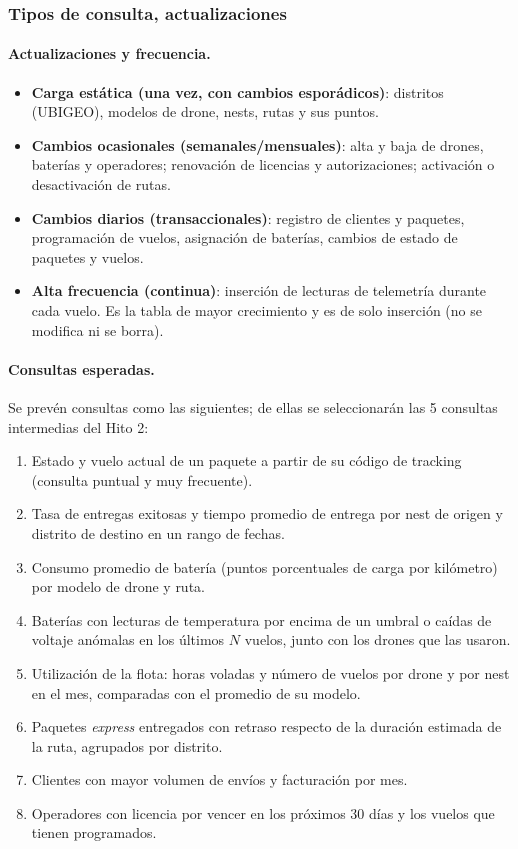 \documentclass[11pt,a4paper]{article}
\begin{document}
\subsubsection{Tipos de consulta, actualizaciones}
\paragraph{Actualizaciones y frecuencia.}
\begin{itemize}
\item \textbf{Carga estática (una vez, con cambios esporádicos)}: distritos (UBIGEO), modelos de drone, nests, rutas y sus puntos.
\item \textbf{Cambios ocasionales (semanales/mensuales)}: alta y baja de drones, baterías y operadores; renovación de licencias y autorizaciones; activación o desactivación de rutas.
\item \textbf{Cambios diarios (transaccionales)}: registro de clientes y paquetes, programación de vuelos, asignación de baterías, cambios de estado de paquetes y vuelos.
\item \textbf{Alta frecuencia (continua)}: inserción de lecturas de telemetría durante cada vuelo. Es la tabla de mayor crecimiento y es de solo inserción (no se modifica ni se borra).
\end{itemize}

\paragraph{Consultas esperadas.} Se prevén consultas como las siguientes; de ellas se seleccionarán las 5 consultas intermedias del Hito 2:
\begin{enumerate}
\item Estado y vuelo actual de un paquete a partir de su código de tracking (consulta puntual y muy frecuente).
\item Tasa de entregas exitosas y tiempo promedio de entrega por nest de origen y distrito de destino en un rango de fechas.
\item Consumo promedio de batería (puntos porcentuales de carga por kilómetro) por modelo de drone y ruta.
\item Baterías con lecturas de temperatura por encima de un umbral o caídas de voltaje anómalas en los últimos $N$ vuelos, junto con los drones que las usaron.
\item Utilización de la flota: horas voladas y número de vuelos por drone y por nest en el mes, comparadas con el promedio de su modelo.
\item Paquetes \emph{express} entregados con retraso respecto de la duración estimada de la ruta, agrupados por distrito.
\item Clientes con mayor volumen de envíos y facturación por mes.
\item Operadores con licencia por vencer en los próximos 30 días y los vuelos que tienen programados.
\end{enumerate}
\end{document}
